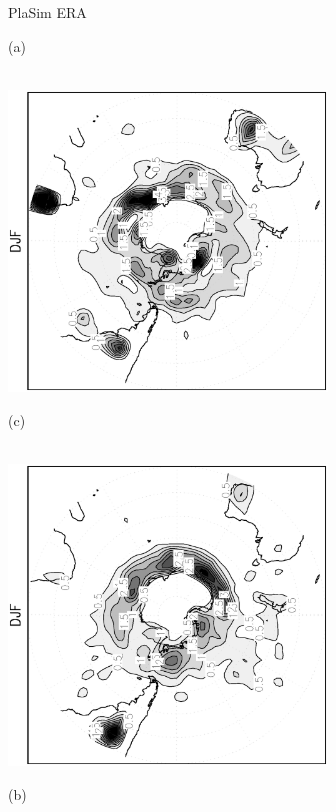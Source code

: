 \documentclass[12pt,a4paper,twoside,openright,headinclude,liststotoc,bibtotoc]{scrreprt}
\begin{document}
\begin{appendix}
\begin{figure}[b]
\hspace{3.8cm}PlaSim \vspace{0.2cm} \hspace{7.3cm} ERA \\
\parbox{8.5cm}{\hspace{0.95cm}\begin{scriptsize}(a)\end{scriptsize} \vspace{-0.5cm} \\
\includegraphics[height=8.0cm,angle=-90]
{eps/cycllys_PLASIM_T21_45DJF_SH.eps}
}
\parbox{8.5cm}{\hspace{0.95cm}\begin{scriptsize}(c)\end{scriptsize} \vspace{-0.5cm} \\
\includegraphics[height=8.0cm,angle=-90]
{eps/cycllys_ERA40_T21_45DJF_SH.eps}
}
\parbox{8.5cm}{\hspace{0.95cm}\begin{scriptsize}(b)\end{scriptsize} \vspace{-0.5cm} \\
}
\end{figure}
\end{appendix}
\end{document}
